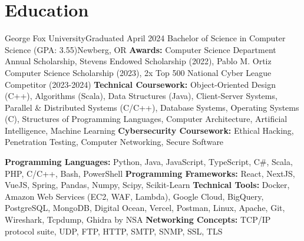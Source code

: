 
\section{Education}
\resumeSubHeadingListStart
    \resumeEducationSubheading
        {George Fox University}{Graduated April 2024}
        {Bachelor of Science in Computer Science (GPA: 3.55)}{Newberg, OR}
        {\textbf{Awards:} Computer Science Department Annual Scholarship, Stevens Endowed Scholarship (2022), Pablo M. Ortiz Computer Science Scholarship (2023), 2x Top 500 National Cyber League Competitor (2023-2024)}
        {\textbf{Technical Coursework:} Object-Oriented Design (C++), Algorithms (Scala), Data Structures (Java), Client-Server Systems, Parallel \& Distributed Systems (C/C++), Database Systems, Operating Systems (C), Structures of Programming Languages, Computer Architecture, Artificial Intelligence, Machine Learning}
        {\textbf{Cybersecurity Coursework:} Ethical Hacking, Penetration Testing, Computer Networking, Secure Software}

    \resumeSkillsSubheading
        {\textbf{Programming Languages:} Python, Java, JavaScript, TypeScript, C\#, Scala, PHP, C/C++, Bash, PowerShell}
        {\textbf{Programming Frameworks:} React, NextJS, VueJS, Spring, Pandas, Numpy, Scipy, Scikit-Learn}
        {\textbf{Technical Tools:} Docker, Amazon Web Services (EC2, WAF, Lambda), Google Cloud, BigQuery, PostgreSQL, MongoDB, Digital Ocean, Vercel, Postman, Linux, Apache, Git, Wireshark, Tcpdump, Ghidra by NSA}
        {\textbf{Networking Concepts:} TCP/IP protocol suite, UDP, FTP, HTTP, SMTP, SNMP, SSL, TLS}

\resumeSubHeadingListEnd


